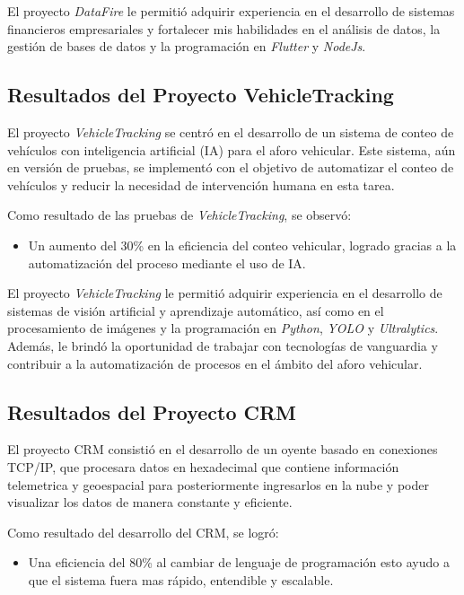 \documentclass[protocolo.tex]{subfiles}
\begin{document}
El proyecto \textit{DataFire} le permitió adquirir experiencia en el desarrollo de sistemas financieros empresariales y fortalecer mis habilidades en el análisis de datos, la gestión de bases de datos y la programación en \textit{Flutter} y \textit{NodeJs}.


\subsection{Resultados del Proyecto VehicleTracking}

El proyecto  \textit{VehicleTracking} se centró en el desarrollo de un sistema de conteo de vehículos con inteligencia artificial (IA) para el aforo vehicular.  Este sistema, aún en versión de pruebas, se implementó con el objetivo de automatizar el conteo de vehículos y reducir la necesidad de intervención humana en esta tarea.\vspace{4mm}

Como resultado de las pruebas de \textit{VehicleTracking}, se observó:

\begin{itemize}
\item Un aumento del 30\% en la eficiencia del conteo vehicular,  logrado gracias a la automatización del proceso mediante el uso de IA.
\end{itemize}

El proyecto \textit{VehicleTracking} le permitió adquirir experiencia en el desarrollo de sistemas de visión artificial y aprendizaje automático, así como en el procesamiento de imágenes y la programación en  \textit{Python},  \textit{YOLO} y  \textit{Ultralytics}.  Además, le brindó la oportunidad de trabajar con tecnologías de vanguardia y contribuir a la automatización de procesos en el ámbito del aforo vehicular.

\subsection{Resultados del Proyecto CRM}

El proyecto CRM consistió en el desarrollo de un oyente basado en conexiones TCP/IP, que procesara datos en hexadecimal que contiene información telemetrica y geoespacial para posteriormente ingresarlos en la nube y poder visualizar los datos de manera constante y eficiente. \vspace{4mm}

Como resultado del desarrollo del CRM, se logró:

\begin{itemize}
    \item Una eficiencia del 80\% al cambiar de lenguaje de programación esto ayudo a que el sistema fuera mas rápido, entendible y escalable.
\end{itemize}
\end{document}
